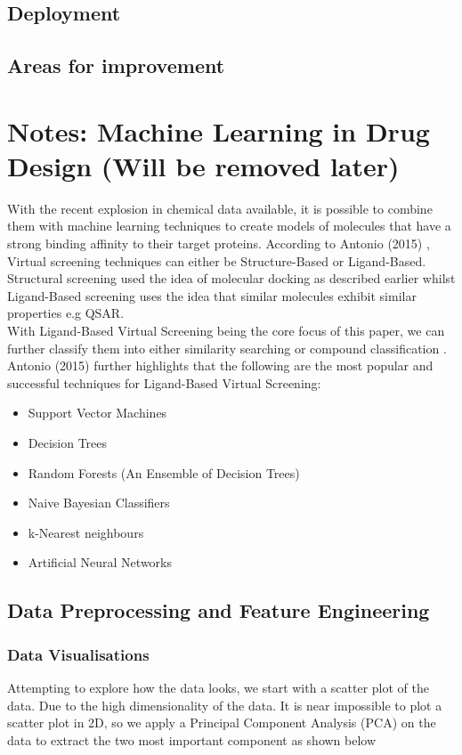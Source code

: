\documentclass[a4paper,12pt]{report}
\begin{document}
	\section{Deployment}
	\section{Areas for improvement}


\chapter[Notes]{Notes: Machine Learning in Drug Design (Will be removed later)}
	With the recent explosion in chemical data available, it is possible to combine them with machine learning techniques to create models of molecules that have a strong binding affinity to their target proteins. According to Antonio (2015) \cite{Antonio2015}, Virtual screening techniques can either be Structure-Based or Ligand-Based. Structural screening used the idea of molecular docking as described earlier whilst Ligand-Based screening uses the idea that similar molecules exhibit similar properties e.g QSAR. 
	\\
	With Ligand-Based Virtual Screening being the core focus of this paper, we can further classify them into either similarity searching or compound classification \cite{Antonio2015}. Antonio (2015) \cite{Antonio2015} further highlights that the following are the most popular and successful techniques for Ligand-Based Virtual Screening:
	\begin{itemize}
		\item Support Vector Machines
		\item Decision Trees
		\item Random Forests (An Ensemble of Decision Trees)
		\item Naive Bayesian Classifiers
		\item k-Nearest neighbours
		\item Artificial Neural Networks
	\end{itemize}
	\section{Data Preprocessing and Feature Engineering}
		\subsection{Data Visualisations}
		Attempting to explore how the data looks, we start with a scatter plot of the data. Due to the high dimensionality of the data. It is near impossible to plot a scatter plot in 2D, so we apply a Principal Component Analysis (PCA) on the data to extract the two most important component as shown below
\end{document}
